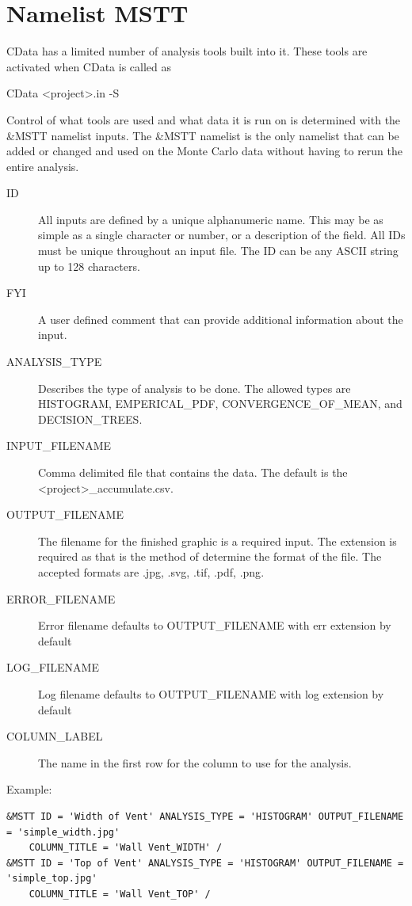 \documentclass[12pt,twoside]{book}
\begin{document}
\section{Namelist MSTT}
\label{info:MSTT}

CData has a limited number of analysis tools built into it. These tools are activated when CData is called as

{\ct CData <project>.in -S}

Control of what tools are used and what data it is run on is determined with the {\ct \&MSTT} namelist inputs. The {\ct \&MSTT} namelist is the only namelist that can be added or changed and used on the Monte Carlo data without having to rerun the entire analysis.


\begin{description}
 \item[ID] All inputs are defined by a unique alphanumeric name. This may be as simple as a single character or number, or a description of the field. All IDs must be unique throughout an input file. The { \ct ID} can be any ASCII string up to 128 characters.
  \item[FYI] A user defined comment that can provide additional information about the input.
 \item[ANALYSIS\_TYPE] Describes the type of analysis to be done. The allowed types are {\ct HISTOGRAM}, {\ct EMPERICAL\_PDF}, {\ct CONVERGENCE\_OF\_MEAN}, and {\ct DECISION\_TREES}.
 \item[INPUT\_FILENAME] Comma delimited file that contains the data. The default is the \\
     {\ct <project>\_accumulate.csv}.
 \item[OUTPUT\_FILENAME] The filename for the finished graphic is a required input. The extension is required as that is the method of determine the format of the file. The accepted formats are {\ct *.jpg}, {\ct *.svg}, {\ct *.tif}, {\ct *.pdf}, {\ct *.png}.
 \item[ERROR\_FILENAME] Error filename defaults to {\ct OUTPUT\_FILENAME} with {\ct err} extension by default
 \item[LOG\_FILENAME] Log filename defaults to {\ct OUTPUT\_FILENAME} with {\ct log} extension by default
 \item[COLUMN\_LABEL] The name in the first row for the column to use for the analysis.
\end{description}

\vspace{\baselineskip}
\noindent Example:
\begin{lstlisting}[basicstyle=\scriptsize]
&MSTT ID = 'Width of Vent' ANALYSIS_TYPE = 'HISTOGRAM' OUTPUT_FILENAME = 'simple_width.jpg'
	COLUMN_TITLE = 'Wall Vent_WIDTH' /
&MSTT ID = 'Top of Vent' ANALYSIS_TYPE = 'HISTOGRAM' OUTPUT_FILENAME = 'simple_top.jpg'
	COLUMN_TITLE = 'Wall Vent_TOP' /
\end{lstlisting}
\end{document}
